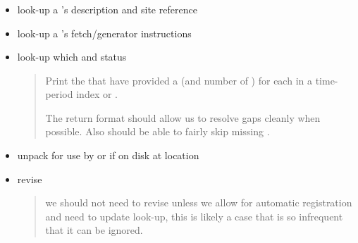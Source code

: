 \documentclass[11pt]{article} %
\newenvironment{slimlist}{
  \begin{itemize}
    \setlength{\topsep}{0pt}
    \setlength{\itemsep}{1pt}
    \setlength{\parsep}{0pt}
    \setlength{\parskip}{0pt}
}{\end{itemize}}
\newenvironment{mitemize}[1]{
  \begin{minipage}{0.9\linewidth}
  \subsubsection*{#1}
  \begin{slimlist}
}{\end{slimlist}\end{minipage}}
\begin{document}
\begin{mitemize}{\cp}
\item look-up a \cp's description and site reference
\item look-up a \ds's fetch/generator instructions
\item look-up which \ins and \ds status 
  \begin{quote}
    Print the  that have provided a \sol (and number of ) for each \ds in a time-period index or \ins .
    
    The return format should allow us to resolve gaps cleanly when possible. Also should be able to fairly skip missing .
  \end{quote}
\item unpack \ds for use by \ev or \sol if on disk at location

\item revise \ds
\begin{quote}
  we should not need to revise unless we allow for automatic registration and need to update look-up, this is likely a case that is so infrequent that it can be ignored. 
\end{quote}
\end{mitemize}

\def\t24{\form{TA2-4}}
\end{document}
